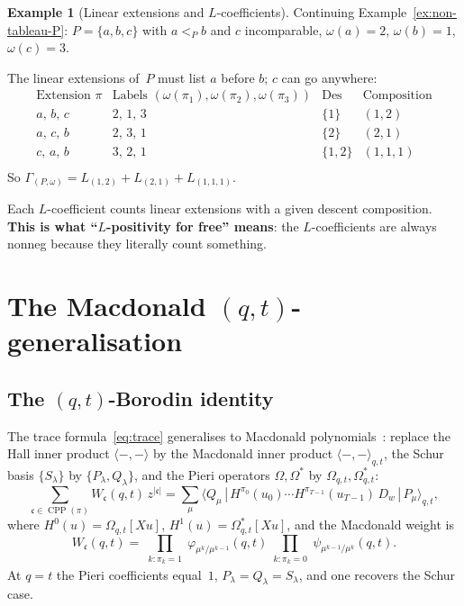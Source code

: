 \documentclass[11pt]{article}
\theoremstyle{plain}
\theoremstyle{definition}
\newtheorem{example}[theorem]{Example}
\theoremstyle{remark}
\newcommand{\CPP}{\operatorname{CPP}}
\newcommand{\Des}{\operatorname{Des}}
\begin{document}
\begin{example}[Linear extensions and $L$-coefficients]
\label{ex:linear-ext}
Continuing Example~\ref{ex:non-tableau-P}:
$P = \{a, b, c\}$ with $a <_P b$ and $c$ incomparable,
$\omega(a)=2$, $\omega(b)=1$, $\omega(c)=3$.

The linear extensions of~$P$ must list $a$ before $b$;
$c$ can go anywhere:
\[
\renewcommand{\arraystretch}{1.3}
\begin{array}{cccc}
  \text{Extension } \pi & \text{Labels } (\omega(\pi_1),
    \omega(\pi_2), \omega(\pi_3))
  & \Des & \text{Composition} \\
  \hline
  a,\, b,\, c & 2,\, 1,\, 3 & \{1\} & (1,2) \\
  a,\, c,\, b & 2,\, 3,\, 1 & \{2\} & (2,1) \\
  c,\, a,\, b & 3,\, 2,\, 1 & \{1,2\} & (1,1,1) \\
\end{array}
\]
So $\Gamma_{(P,\omega)} = L_{(1,2)} + L_{(2,1)} + L_{(1,1,1)}$.

Each $L$-coefficient counts linear extensions with a given
descent composition.  \textbf{This is what ``$L$-positivity
for free'' means}: the $L$-coefficients are always nonneg
because they literally count something.
\end{example}


\section{The Macdonald $(q,t)$-generalisation}
\label{sec:macdonald}


\subsection{The $(q,t)$-Borodin identity}

The trace formula~\eqref{eq:trace} generalises to Macdonald
polynomials~\cite{langer-thesis}: replace the Hall inner product
$\langle -, - \rangle$ by the Macdonald inner product
$\langle -, - \rangle_{q,t}$, the Schur basis $\{S_\lambda\}$
by $\{P_\lambda, Q_\lambda\}$, and the Pieri operators
$\Omega, \Omega^*$ by $\Omega_{q,t}, \Omega^*_{q,t}$:
\begin{equation}\label{eq:mac-trace}
  \sum_{\mathfrak{c} \in \CPP(\pi)} W_{\mathfrak{c}}(q,t)\,
  z^{|\mathfrak{c}|}
  = \sum_\mu \langle Q_\mu \,|\,
  H^{\pi_0}(u_0) \cdots H^{\pi_{T-1}}(u_{T-1})\,
  D_w \,|\, P_\mu \rangle_{q,t},
\end{equation}
where $H^0(u) = \Omega_{q,t}[Xu]$,
$H^1(u) = \Omega^*_{q,t}[Xu]$, and the Macdonald weight is
\[
  W_{\mathfrak{c}}(q,t)
  = \prod_{\substack{k: \pi_k = 1}}
  \varphi_{\mu^k/\mu^{k-1}}(q,t)
  \prod_{\substack{k: \pi_k = 0}}
  \psi_{\mu^{k-1}/\mu^k}(q,t).
\]
At $q = t$ the Pieri coefficients equal~$1$,
$P_\lambda = Q_\lambda = S_\lambda$, and one recovers
the Schur case.
\end{document}
